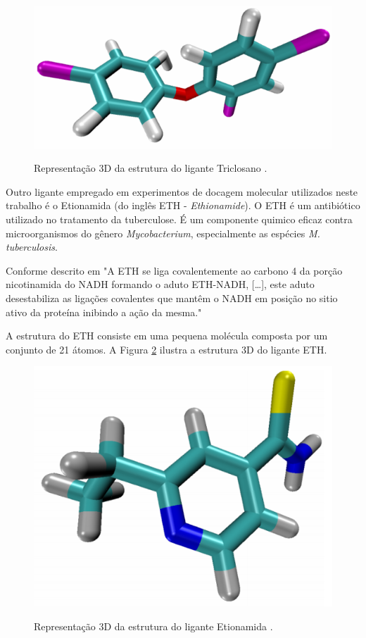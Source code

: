 \begin{figure}[h]
	\center
	\includegraphics[width=14cm]{images/tcl.png}
	\label{fig:tcl}
	\caption{Representação 3D da estrutura do ligante Triclosano \cite{kar11}.}
\end{figure}

Outro ligante empregado em experimentos de docagem molecular utilizados neste trabalho é o Etionamida (do inglês ETH - \emph{Ethionamide}). O ETH é um antibiótico utilizado no tratamento da tuberculose. É um componente quimico eficaz contra microorganismos do gênero \emph{Mycobacterium}, especialmente as espécies \emph{M. tuberculosis}. 

Conforme descrito em \cite{COH10} "A ETH se liga covalentemente ao carbono 4 da porção nicotinamida do NADH formando o aduto ETH-NADH, […], este aduto desestabiliza as ligações covalentes que mantêm o NADH em posição no sitio ativo da proteína inibindo a ação da mesma."

A estrutura do ETH consiste em uma pequena molécula composta por um conjunto de 21 átomos. A Figura \ref{fig:eth} ilustra a estrutura 3D do ligante ETH.

\begin{figure}[h]
	\center
	\includegraphics[width=14cm]{images/eth.png}
	\label{fig:eth}
	\caption{Representação 3D da estrutura do ligante Etionamida \cite{kar11}.}
\end{figure}

